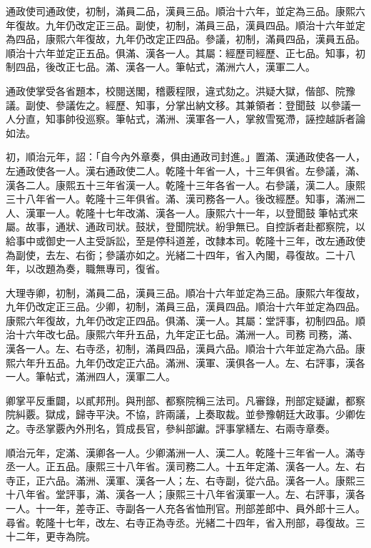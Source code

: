 \begin{pinyinscope}
通政使司通政使，初制，滿員二品，漢員三品。順治十六年，並定為三品。康熙六年復故。九年仍改定正三品。副使，初制，滿員三品，漢員四品。順治十六年並定為四品，康熙六年復故，九年仍改定正四品。參議，初制，滿員四品，漢員五品。順治十六年並定正五品。俱滿、漢各一人。其屬：經歷司經歷、正七品。知事，初制四品，後改正七品。滿、漢各一人。筆帖式，滿洲六人，漢軍二人。

通政使掌受各省題本，校閱送閣，稽覈程限，違式劾之。洪疑大獄，偕部、院豫議。副使、參議佐之。經歷、知事，分掌出納文移。其兼領者：登聞鼓，以參議一人分直，知事帥役巡察。筆帖式，滿洲、漢軍各一人，掌敘雪冤滯，誣控越訴者論如法。

初，順治元年，詔：「自今內外章奏，俱由通政司封進。」置滿、漢通政使各一人，左通政使各一人。漢右通政使二人。乾隆十年省一人，十三年俱省。左參議，滿、漢各二人。康熙五十三年省漢一人。乾隆十三年各省一人。右參議，漢二人。康熙三十八年省一人。乾隆十三年俱省。滿、漢司務各一人。後改經歷。知事，滿洲二人、漢軍一人。乾隆十七年改滿、漢各一人。康熙六十一年，以登聞鼓筆帖式來屬。故事，通狀、通政司狀。鼓狀，登聞院狀。紛爭無已。自控訴者赴都察院，以給事中或御史一人主受訴訟，至是停科道差，改隸本司。乾隆十三年，改左通政使為副使，去左、右銜；參議亦如之。光緒二十四年，省入內閣，尋復故。二十八年，以改題為奏，職無專司，復省。

大理寺卿，初制，滿員二品，漢員三品。順冶十六年並定為三品。康熙六年復故，九年仍改定正三品。少卿，初制，滿員三品，漢員四品。順治十六年並定為四品。康熙六年復故，九年仍改定正四品。俱滿、漢一人。其屬：堂評事，初制四品。順治十六年改七品。康熙六年升五品，九年定正七品。滿洲一人。司務司務，滿、漢各一人。左、右寺丞，初制，滿員四品，漢員六品。順治十六年並定為六品。康熙六年升五品。九年仍改定正六品。滿洲、漢軍、漢俱各一人。左、右評事，漢各一人。筆帖式，滿洲四人，漢軍二人。

卿掌平反重闢，以貳邦刑。與刑部、都察院稱三法司。凡審錄，刑部定疑讞，都察院糾覈。獄成，歸寺平決。不協，許兩議，上奏取裁。並參豫朝廷大政事。少卿佐之。寺丞掌覈內外刑名，質成長官，參糾部讞。評事掌繕左、右兩寺章奏。

順治元年，定滿、漢卿各一人。少卿滿洲一人、漢二人。乾隆十三年省一人。滿寺丞一人。正五品。康熙三十八年省。漢司務二人。十五年定滿、漢各一人。左、右寺正，正六品。滿洲、漢軍、漢各一人；左、右寺副，從六品。漢各一人。康熙三十八年省。堂評事，滿、漢各一人；康熙三十八年省漢軍一人。左、右評事，漢各一人。十一年，差寺正、寺副各一人充各省恤刑官。刑部差郎中、員外郎十三人。尋省。乾隆十七年，改左、右寺正為寺丞。光緒二十四年，省入刑部，尋復故。三十二年，更寺為院。


\end{pinyinscope}
